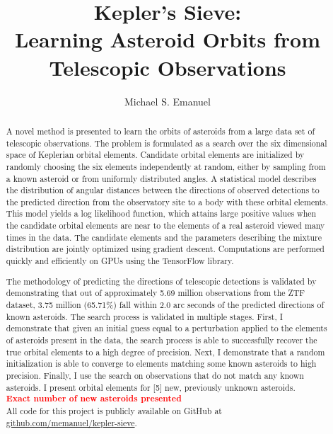 \documentclass[11pt]{gsasthesis} %
\title{Kepler's Sieve: \\Learning Asteroid Orbits from Telescopic Observations} %
\author{Michael S. Emanuel} %
\newcommand\todo[1]{\textbf{\textcolor{red}{#1}}}
\begin{document}


\thesistitlepage
\copyrightpage
\begin{abstract}
A novel method is presented to learn the orbits of asteroids from a large data set of telescopic observations.
The problem is formulated as a search over the six dimensional space of Keplerian orbital elements.
Candidate orbital elements are initialized by randomly choosing the six elements independently 
at random, either by sampling from a known asteroid or from uniformly distributed angles.
A statistical model describes the distribution of angular distances between the directions 
of observed detections to the predicted direction from the observatory site to a body with these orbital elements.
This model yields a log likelihood function, which attains large positive values when the candidate orbital elements are near 
to the elements of a real asteroid viewed many times in the data.
The candidate elements and the parameters describing the mixture distribution are jointly optimized using gradient descent.
Computations are performed quickly and efficiently on GPUs using the TensorFlow library.

The methodology of predicting the directions of telescopic detections is validated by demonstrating 
that out of approximately 5.69 million observations from the ZTF dataset,
3.75 million (65.71\%) fall within 2.0 arc seconds of the predicted directions of known asteroids.
The search process is validated in multiple stages.
First, I demonstrate that given an initial guess equal to a perturbation applied to the elements of asteroids present in the data,
the search process is able to successfully recover the true orbital elements to a high degree of precision.
Next, I demonstrate that a random initialization is able to converge to elements matching some known asteroids to high precision.
Finally, I use the search on observations that do not match any known asteroids.
I present orbital elements for [5] new, previously unknown asteroids.\\
\todo{Exact number of new asteroids presented}\\
All code for this project is publicly available on GitHub at \href{https://github.com/memanuel/kepler-sieve}{github.com/memanuel/kepler-sieve}.

\end{abstract}
\end{document}
